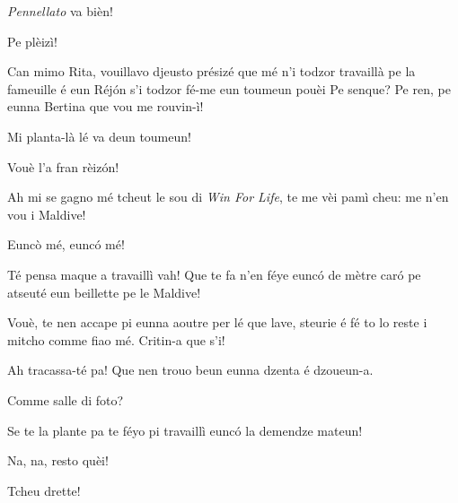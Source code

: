 \begin{drama}
\Eumprezeospeaks \textit{Pennellato} va bièn!

\Ritaspeaks {} Pe plèizì!

\Tobiespeaks Can mimo Rita, vouillavo djeusto présizé que mé n’i todzor travaillà pe la fameuille é eun Réjón s’i todzor fé-me eun toumeun pouèi  Pe senque? Pe ren, pe eunna Bertina que vou me rouvin-ì!

\Eumprezeospeaks Mi planta-là lé va deun toumeun!

\Bertinaspeaks Vouè l’a fran rèizón!

\Tobiespeaks  {} Ah mi se gagno mé tcheut le sou di \textit{Win For Life}, te me vèi pamì cheu: me n'en vou i Maldive!

\Simonspeaks Eunc\`o mé, eunc\'o mé!

\Eumprezeospeaks Té pensa maque a travaillì vah! Que te fa n'en féye eunc\'o de mètre caró pe atseuté eun beillette pe le Maldive!

\Bertinaspeaks {} Vouè, te nen accape pi eunna aoutre per lé que lave, steurie é fé to lo reste i mitcho comme fiao mé. Critin-a que s’i!

\Tobiespeaks Ah tracassa-té pa! Que nen trouo beun eunna dzenta é dzoueun-a.

\Simonspeaks Comme salle di foto?

\Eumprezeospeaks Se te la plante pa te féyo pi travaillì eunc\'o la demendze mateun!

\Simonspeaks Na, na, resto quèi!


\Pascalspeaks Tcheu drette!



\end{drama}
